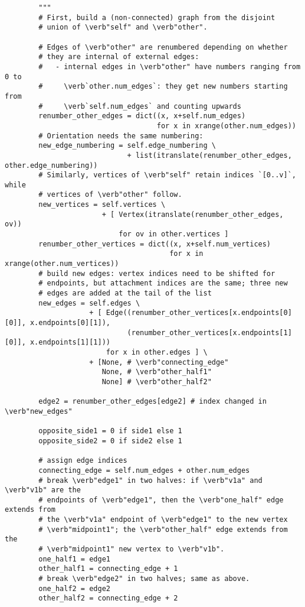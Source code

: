 \begin{lstlisting}
        """
        # First, build a (non-connected) graph from the disjoint
        # union of \verb"self" and \verb"other".

        # Edges of \verb"other" are renumbered depending on whether
        # they are internal of external edges:
        #   - internal edges in \verb"other" have numbers ranging from 0 to
        #     \verb`other.num_edges`: they get new numbers starting from
        #     \verb`self.num_edges` and counting upwards
        renumber_other_edges = dict((x, x+self.num_edges)
                                    for x in xrange(other.num_edges))
        # Orientation needs the same numbering:
        new_edge_numbering = self.edge_numbering \
                             + list(itranslate(renumber_other_edges, other.edge_numbering))
        # Similarly, vertices of \verb"self" retain indices `[0..v]`, while
        # vertices of \verb"other" follow.
        new_vertices = self.vertices \
                       + [ Vertex(itranslate(renumber_other_edges, ov))
                           for ov in other.vertices ]
        renumber_other_vertices = dict((x, x+self.num_vertices)
                                       for x in xrange(other.num_vertices))
        # build new edges: vertex indices need to be shifted for
        # endpoints, but attachment indices are the same; three new
        # edges are added at the tail of the list
        new_edges = self.edges \
                    + [ Edge((renumber_other_vertices[x.endpoints[0][0]], x.endpoints[0][1]),
                             (renumber_other_vertices[x.endpoints[1][0]], x.endpoints[1][1]))
                        for x in other.edges ] \
                    + [None, # \verb"connecting_edge"
                       None, # \verb"other_half1"
                       None] # \verb"other_half2"

        edge2 = renumber_other_edges[edge2] # index changed in \verb"new_edges"
        
        opposite_side1 = 0 if side1 else 1
        opposite_side2 = 0 if side2 else 1

        # assign edge indices
        connecting_edge = self.num_edges + other.num_edges
        # break \verb"edge1" in two halves: if \verb"v1a" and \verb"v1b" are the
        # endpoints of \verb"edge1", then the \verb"one_half" edge extends from
        # the \verb"v1a" endpoint of \verb"edge1" to the new vertex
        # \verb"midpoint1"; the \verb"other_half" edge extends from the
        # \verb"midpoint1" new vertex to \verb"v1b".
        one_half1 = edge1
        other_half1 = connecting_edge + 1
        # break \verb"edge2" in two halves; same as above.
        one_half2 = edge2
        other_half2 = connecting_edge + 2


\end{lstlisting}
